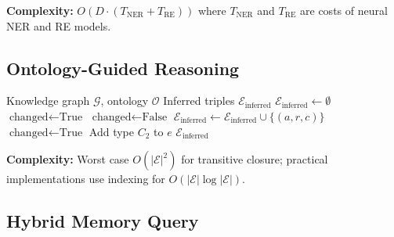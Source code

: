 \documentclass[conference]{IEEEtran}
\begin{document}
\textbf{Complexity:} $O(D \cdot (T_{\text{NER}} + T_{\text{RE}}))$ where $T_{\text{NER}}$ and $T_{\text{RE}}$ are costs of neural NER and RE models.

\subsection{Ontology-Guided Reasoning}

\begin{algorithm}
\caption{Ontological Inference}
\begin{algorithmic}[1]
\REQUIRE Knowledge graph $\mathcal{G}$, ontology $\mathcal{O}$
\ENSURE Inferred triples $\mathcal{E}_{\text{inferred}}$
\STATE $\mathcal{E}_{\text{inferred}} \leftarrow \emptyset$
\STATE $\text{changed} \leftarrow \text{True}$
    \STATE $\text{changed} \leftarrow \text{False}$
                    \STATE $\mathcal{E}_{\text{inferred}} \leftarrow \mathcal{E}_{\text{inferred}} \cup \{(a, r, c)\}$
                    \STATE $\text{changed} \leftarrow \text{True}$
                \ENDIF
            \ENDFOR
        \ENDIF
                \STATE Add type $C_2$ to $e$
            \ENDFOR
        \ENDIF
    \ENDFOR
\ENDWHILE
\RETURN $\mathcal{E}_{\text{inferred}}$
\end{algorithmic}
\end{algorithm}

\textbf{Complexity:} Worst case $O(|\mathcal{E}|^2)$ for transitive closure; practical implementations use indexing for $O(|\mathcal{E}| \log |\mathcal{E}|)$.

\subsection{Hybrid Memory Query}
\end{document}
